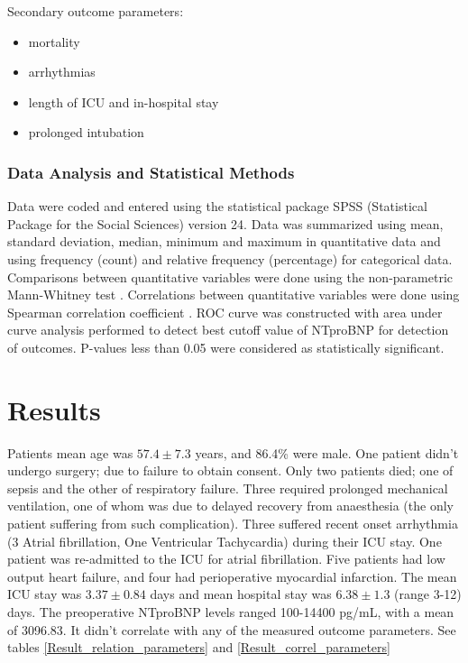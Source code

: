 \documentclass[14pt,a4paper,onecolumn]{extarticle}
\begin{document}
Secondary outcome parameters:
    \begin{itemize}
        \item mortality
        \item arrhythmias
        \item length of ICU and in-hospital stay
        \item prolonged intubation
    \end{itemize}

\subsubsection{Data Analysis and Statistical Methods}
Data were coded and entered using the statistical package SPSS (Statistical Package for the Social Sciences) version 24. Data was summarized using mean, standard deviation, median, minimum and maximum in quantitative data and using frequency (count) and relative frequency (percentage) for categorical data. Comparisons between quantitative variables were done using the non-parametric Mann-Whitney test \citep{Chan_a_2003}. Correlations between quantitative variables were done using Spearman correlation coefficient \citep{Chan_b_2003}.  ROC curve was constructed with area under curve analysis performed to detect best cutoff value of NTproBNP for detection of outcomes. P-values less than 0.05 were considered as statistically significant.

\clearpage
\section{Results}

Patients mean age was $57.4\pm7.3$ years, and 86.4\% were male.  One patient didn't undergo surgery; due to failure to obtain consent. Only two patients died; one of sepsis and the other of respiratory failure. Three required prolonged mechanical ventilation, one of whom was due to delayed recovery from anaesthesia (the only patient suffering from such complication). Three suffered recent onset arrhythmia (3 Atrial fibrillation, One Ventricular Tachycardia) during their ICU stay. One patient was re-admitted to the ICU for atrial fibrillation.  Five patients had low output heart failure, and four had perioperative myocardial infarction. The mean ICU stay was $3.37\pm0.84$ days and mean hospital stay was $6.38\pm1.3$ (range 3-12) days.  The preoperative NTproBNP levels ranged 100-14400 pg/mL, with a mean of 3096.83. It didn't correlate with any of the measured outcome parameters. See tables \ref{Result_relation_parameters} and \ref{Result_correl_parameters}
\end{document}

